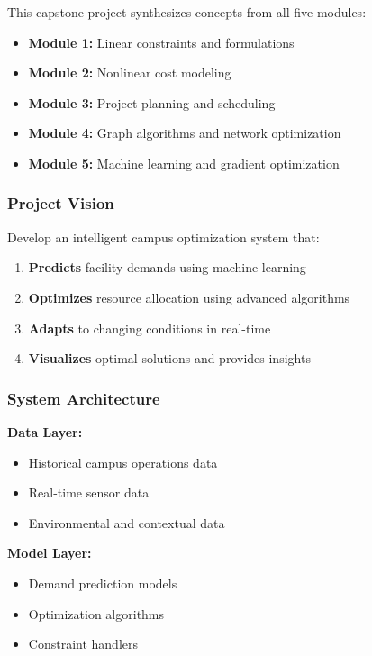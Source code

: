 \documentclass[
  letterpaper,
  DIV=11,
  numbers=noendperiod]{scrreprt}
\providecommand{\tightlist}{%
  \setlength{\itemsep}{0pt}\setlength{\parskip}{0pt}}
\begin{document}
This capstone project synthesizes concepts from all five modules:

\begin{itemize}
\tightlist
\item
  \textbf{Module 1:} Linear constraints and formulations
\item
  \textbf{Module 2:} Nonlinear cost modeling
\item
  \textbf{Module 3:} Project planning and scheduling
\item
  \textbf{Module 4:} Graph algorithms and network optimization
\item
  \textbf{Module 5:} Machine learning and gradient optimization
\end{itemize}

\subsubsection{Project Vision}\label{project-vision}

Develop an intelligent campus optimization system that:

\begin{enumerate}
\def\labelenumi{\arabic{enumi}.}
\tightlist
\item
  \textbf{Predicts} facility demands using machine learning
\item
  \textbf{Optimizes} resource allocation using advanced algorithms
\item
  \textbf{Adapts} to changing conditions in real-time
\item
  \textbf{Visualizes} optimal solutions and provides insights
\end{enumerate}

\subsubsection{System Architecture}\label{system-architecture}

\textbf{Data Layer:}

\begin{itemize}
\tightlist
\item
  Historical campus operations data
\item
  Real-time sensor data
\item
  Environmental and contextual data
\end{itemize}

\textbf{Model Layer:}

\begin{itemize}
\tightlist
\item
  Demand prediction models
\item
  Optimization algorithms
\item
  Constraint handlers
\end{itemize}
\end{document}
